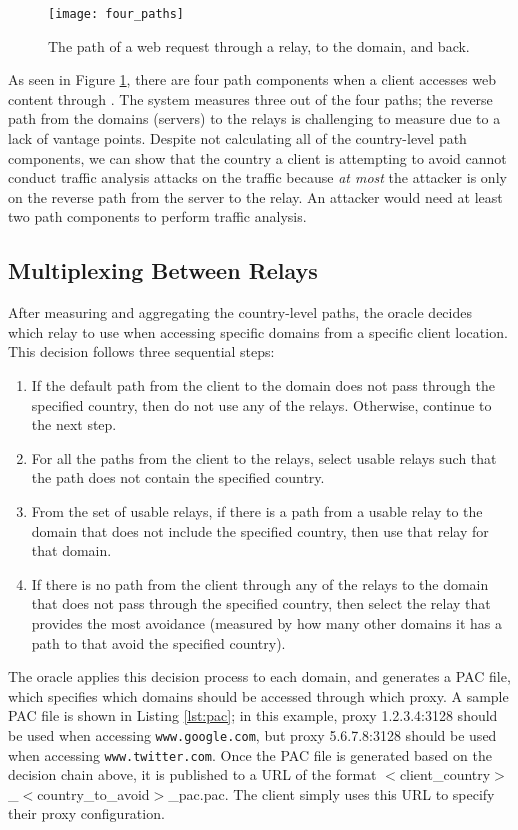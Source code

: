 \begin{figure}[t]
\centering
\texttt{[image: four\_paths]}
\caption{The path of a web request through a \system{} relay, to the domain, and back.}
\label{fig:path_components}
\end{figure}

As seen in Figure \ref{fig:path_components}, there are four path components 
when a client accesses web content through \system{}.  The system measures three 
out of the four paths; the reverse path from the domains (servers) to the relays 
is challenging to measure due to a lack of vantage points.  Despite not 
calculating all of the country-level path components, we can show that the 
country a client is attempting to avoid cannot conduct traffic analysis attacks 
on the traffic because {\it at most} the attacker is only on the reverse path 
from the server to the relay.  An attacker would need at least two path 
components to perform traffic analysis. 

\subsection{Multiplexing Between Relays}
\label{multiplex}
After measuring and aggregating the country-level paths, the oracle decides 
which relay to use when accessing specific domains from a specific client 
location.  This decision follows three sequential steps:

\begin{enumerate}
\item If the default path from the client to the domain does not pass through 
the specified country, then do not use any of the relays. Otherwise, continue 
to the next step.
\item For all the paths from the client to the relays, select usable relays 
such that the path does not contain the specified country.
\item From the set of usable relays, if there is a path from a 
usable relay to the domain that does not include the specified country, then 
use that relay for that domain.
\item If there is no path from the client through any of the relays to the domain 
that does not pass through the specified country, then select the relay 
that provides the most avoidance (measured by how many other domains it has 
a path to that avoid the specified country).
\end{enumerate}

The oracle applies this decision process to each domain, and generates a PAC 
file, which specifies which domains should be accessed through which proxy.  A 
sample PAC file is shown in Listing \ref{lst:pac}; in this example, proxy 
1.2.3.4:3128 should be used when accessing {\tt www.google.com}, but proxy 
5.6.7.8:3128 should be used when accessing {\tt www.twitter.com}.  Once the PAC 
file is generated based on the decision chain above, it is published to a URL 
of the format $<$client\_country$>$\_$<$country\_to\_avoid$>$\_pac.pac.  The client 
simply uses this URL to specify their proxy configuration.

